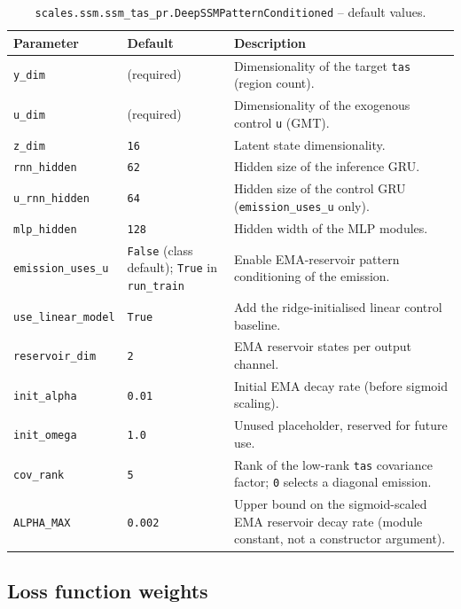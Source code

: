 \documentclass[11pt]{article}
\begin{document}
\begin{table}[h]
\centering
\caption{\texttt{scales.ssm.ssm\_tas\_pr.DeepSSMPatternConditioned} -- default values.}
\begin{tabular}{@{}llL{7cm}@{}}
\toprule
Parameter & Default & Description \\
\midrule
\texttt{y\_dim}          & (required)  & Dimensionality of the target \texttt{tas} (region count). \\
\texttt{u\_dim}          & (required)  & Dimensionality of the exogenous control \texttt{u} (GMT). \\
\texttt{z\_dim}          & \texttt{16}    & Latent state dimensionality. \\
\texttt{rnn\_hidden}     & \texttt{62}    & Hidden size of the inference GRU. \\
\texttt{u\_rnn\_hidden}  & \texttt{64}    & Hidden size of the control GRU (\texttt{emission\_uses\_u} only). \\
\texttt{mlp\_hidden}     & \texttt{128}   & Hidden width of the MLP modules. \\
\texttt{emission\_uses\_u} & \texttt{False} (class default); \texttt{True} in \texttt{run\_train} & Enable EMA-reservoir pattern conditioning of the emission. \\
\texttt{use\_linear\_model} & \texttt{True} & Add the ridge-initialised linear control baseline. \\
\texttt{reservoir\_dim}  & \texttt{2}     & EMA reservoir states per output channel. \\
\texttt{init\_alpha}     & \texttt{0.01}  & Initial EMA decay rate (before sigmoid scaling). \\
\texttt{init\_omega}     & \texttt{1.0}   & Unused placeholder, reserved for future use. \\
\texttt{cov\_rank}       & \texttt{5}     & Rank of the low-rank \texttt{tas} covariance factor; \texttt{0} selects a diagonal emission. \\
\texttt{ALPHA\_MAX}      & \texttt{0.002} & Upper bound on the sigmoid-scaled EMA reservoir decay rate (module constant, not a constructor argument). \\
\bottomrule
\end{tabular}
\end{table}

\subsection{Loss function weights}
\end{document}
